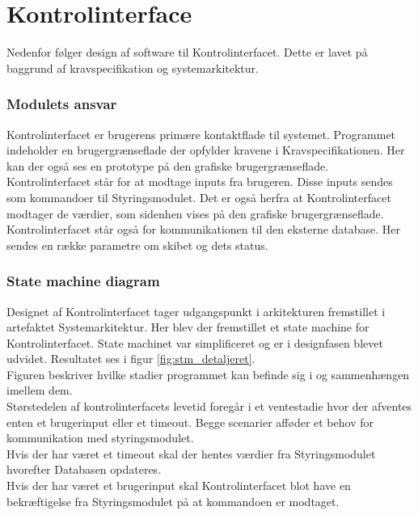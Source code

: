 \chapter{Kontrolinterface}
Nedenfor følger design af software til Kontrolinterfacet. Dette er lavet på baggrund af kravspecifikation og systemarkitektur. 
\subsection{Modulets ansvar}
Kontrolinterfacet er brugerens primære kontaktflade til systemet. Programmet indeholder en brugergrænseflade der opfylder kravene i Kravspecifikationen. Her kan der også ses en prototype på den grafiske brugergrænseflade.
Kontrolinterfacet står for at modtage inputs fra brugeren. Disse inputs sendes som kommandoer til Styringsmodulet. Det er også herfra at Kontrolinterfacet modtager de værdier, som sidenhen vises på den grafiske brugergrænseflade. Kontrolinterfacet står også for kommunikationen til den eksterne database. Her sendes en række parametre om skibet og dets status.

\subsection{State machine diagram}
Designet af Kontrolinterfacet tager udgangspunkt i arkitekturen fremstillet i artefaktet Systemarkitektur. Her blev der fremstillet et state machine for Kontrolinterfacet. State machinet var simplificeret og er i designfasen blevet udvidet. Resultatet ses i figur \ref{fig:stm_detaljeret}.\\
Figuren beskriver hvilke stadier programmet kan befinde sig i og sammenhængen imellem dem.\\
Størstedelen af kontrolinterfacets levetid foregår i et ventestadie hvor der afventes enten et brugerinput eller et timeout. Begge scenarier afføder et behov for kommunikation med styringsmodulet. \\
Hvis der har været et timeout skal der hentes værdier fra Styringsmodulet hvorefter Databasen opdateres.\\
Hvis der har været et brugerinput skal Kontrolinterfacet blot have en bekræftigelse fra Styringsmodulet på at kommandoen er modtaget.\\

